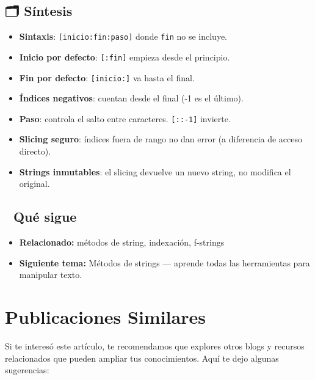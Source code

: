 \documentclass[
  doc,
  floatsintext,
  longtable,
  a4paper,
  nolmodern,
  notxfonts,
  notimes,
  12pt,
  colorlinks=true,linkcolor=blue,citecolor=blue,urlcolor=blue]{apa7}
\providecommand{\tightlist}{%
  \setlength{\itemsep}{0pt}\setlength{\parskip}{0pt}}
\begin{document}
\subsection{🗂️ Síntesis}\label{suxedntesis}

\begin{itemize}
\tightlist
\item
  \textbf{Sintaxis}: \texttt{{[}inicio:fin:paso{]}} donde \texttt{fin}
  no se incluye.
\item
  \textbf{Inicio por defecto}: \texttt{{[}:fin{]}} empieza desde el
  principio.
\item
  \textbf{Fin por defecto}: \texttt{{[}inicio:{]}} va hasta el final.
\item
  \textbf{Índices negativos}: cuentan desde el final (-1 es el último).
\item
  \textbf{Paso}: controla el salto entre caracteres. \texttt{{[}::-1{]}}
  invierte.
\item
  \textbf{Slicing seguro}: índices fuera de rango no dan error (a
  diferencia de acceso directo).
\item
  \textbf{Strings inmutables}: el slicing devuelve un nuevo string, no
  modifica el original.
\end{itemize}

\subsection{🔗 Qué sigue}\label{quuxe9-sigue}

\begin{itemize}
\tightlist
\item
  \textbf{Relacionado:} métodos de string, indexación, f-strings
\item
  \textbf{Siguiente tema:} Métodos de strings --- aprende todas las
  herramientas para manipular texto.
\end{itemize}

\section{Publicaciones Similares}\label{publicaciones-similares}

Si te interesó este artículo, te recomendamos que explores otros blogs y
recursos relacionados que pueden ampliar tus conocimientos. Aquí te dejo
algunas sugerencias:
\end{document}
